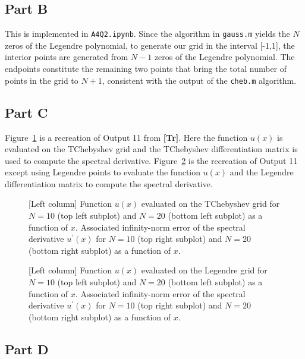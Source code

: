 \documentclass[12pt]{article}
\begin{document}
\subsection*{Part B}

This is implemented in \verb|A4Q2.ipynb|. Since the algorithm in \verb|gauss.m| yields the $N$ zeros of the Legendre polynomial, to generate our grid in the interval [-1,1], the interior points are generated from $N-1$ zeros of the Legendre polynomial. The endpoints 
constitute the remaining two points that bring the total number of points in the grid to $N+1$, consistent with the output of the \verb|cheb.m| algorithm. 

\subsection*{Part C}

Figure~\ref{fig:tchebyshev_err} is a recreation of Output 11 from \textbf{[Tr]}. Here the function $u(x)$ is evaluated on the TChebyshev grid and the TChebyshev differentiation matrix is used to compute the spectral derivative. Figure~\ref{fig:legendre_err} is the recreation of Output 11 except using Legendre points to evaluate the function $u(x)$ and the Legendre differentiation matrix to compute the spectral derivative. 

\begin{figure}[!h]
	\centering
	\caption{[Left column] Function $u(x)$ evaluated on the TChebyshev grid for $N=10$ (top left subplot) and $N=20$ (bottom left subplot) as a function of $x$. Associated infinity-norm error of the spectral derivative $u^{\prime}(x)$ for $N=10$ (top right subplot) and $N=20$ (bottom right subplot) as a function of $x$.}
	\label{fig:tchebyshev_err}
\end{figure}

\begin{figure}[!h]
	\centering	
	\caption{[Left column] Function $u(x)$ evaluated on the Legendre grid for $N=10$ (top left subplot) and $N=20$ (bottom left subplot) as a function of $x$. Associated infinity-norm error of the spectral derivative $u^{\prime}(x)$ for $N=10$ (top right subplot) and $N=20$ (bottom right subplot) as a function of $x$.}
	\label{fig:legendre_err}
\end{figure}

\subsection*{Part D}
\end{document}
